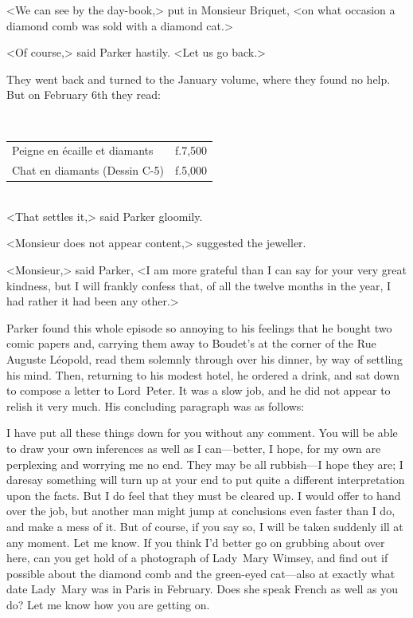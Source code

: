 
<We can see by the day-book,> put in Monsieur Briquet, <on what occasion a diamond comb was sold with a diamond cat.>

<Of course,> said Parker hastily. <Let us go back.>

They went back and turned to the January volume, where they found no help. But on February 6th they read:

~\\
\begin{tabular} { l l } 
\textfrench{Peigne en écaille et diamants}&f.7,500\\
\textfrench{Chat en diamants (Dessin C-5)}&f.5,000\\
\end{tabular}
~\\

<That settles it,> said Parker gloomily.

<Monsieur does not appear content,> suggested the jeweller.

<Monsieur,> said Parker, <I am more grateful than I can say for your very great kindness, but I will frankly confess that, of all the twelve months in the year, I had rather it had been any other.>

Parker found this whole episode so annoying to his feelings that he bought two comic papers and, carrying them away to Boudet's at the corner of the Rue Auguste Léopold, read them solemnly through over his dinner, by way of settling his mind. Then, returning to his modest hotel, he ordered a drink, and sat down to compose a letter to Lord~Peter. It was a slow job, and he did not appear to relish it very much.  His concluding paragraph was as follows:

\begin{mail}{}{}

I have put all these things down for you without any comment. You will be able to draw your own inferences as well as I can—better, I hope, for my own are perplexing and worrying me no end. They may be all rubbish—I hope they are; I daresay something will turn up at your end to put quite a different interpretation upon the facts. But I do feel that they must be cleared up. I would offer to hand over the job, but another man might jump at conclusions even faster than I do, and make a mess of it. But of course, if you say so, I will be taken suddenly ill at any moment. Let me know. If you think I'd better go on grubbing about over here, can you get hold of a photograph of Lady~Mary Wimsey, and find out if possible about the diamond comb and the green-eyed cat—also at exactly what date Lady~Mary was in Paris in February. Does she speak French as well as you do? Let me know how you are getting on.

\end{mail}


